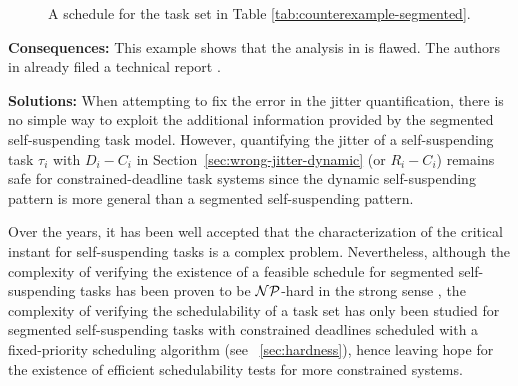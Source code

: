 \begin{figure}[t]
{}       
\caption{A schedule for the task set in Table  \ref{tab:counterexample-segmented}. }
\label{fig:counterexample-segmented}
\end{figure}


{\bf Consequences:} This example shows that the analysis in \cite{RTCSA-BletsasA05} is flawed.  The authors in \cite{RTCSA-BletsasA05}  already filed a technical report \cite{BletsasReport2015}.

{\bf Solutions:} When attempting to fix the error in the jitter quantification, there is no simple way to exploit the additional 
information provided by the segmented self-suspending task model.
However, quantifying the jitter of a self-suspending task $\tau_i$ with $D_i-C_i$ in Section~\ref{sec:wrong-jitter-dynamic} (or $R_i-C_i$) remains safe for constrained-deadline task systems since the dynamic self-suspending pattern is more general than a segmented self-suspending pattern.

\label{sec:wrong-critical}

Over the years, it has been well accepted that the characterization of the critical instant for self-suspending tasks is a complex problem. Nevertheless, although the complexity of verifying the existence of a feasible schedule for segmented self-suspending tasks has been proven to be ${\cal NP}$-hard in the strong sense \cite{Ridouard_2004}, the complexity of verifying the schedulability of a task set has only been studied for segmented self-suspending tasks with constrained deadlines scheduled with a fixed-priority scheduling algorithm (see \mysectionref{}~\ref{sec:hardness}), hence leaving hope for the existence of efficient schedulability tests for more constrained systems. 

